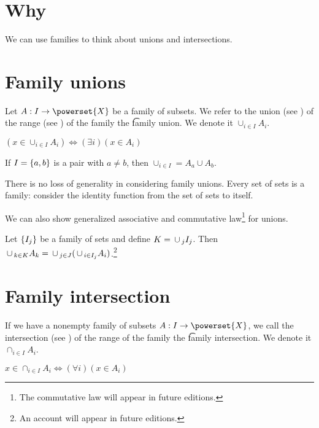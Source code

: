 
\section*{Why}

We can use families to think about unions and intersections.

\section*{Family unions}

Let $A: I \to \powerset{X}$ be a family of subsets.
We refer to the union (see ) of the range (see ) of the family the \t{family union}.
We denote it $\cup_{i \in I} A_i$.

\begin{proposition}
$(x \in \cup_{i \in I} A_i) \iff (\exists i)(x \in A_i)$
\end{proposition}

If $I = \{a, b\}$ is a pair with $a \neq b$, then $\cup_{i \in I} = A_a \cup A_b$.

There is no loss of generality in considering family unions.
Every set of sets is a family: consider the identity function from the set of sets to itself.

We can also show generalized associative and commutative law\footnote{The commutative law will appear in future editions.}
for unions.

\begin{proposition}
Let $\{I_j\}$ be a family of sets and define $K = \,\cup\,_{j} I_j$. Then $\,\cup\,_{k \in K} A_k = \,\cup\,_{j \in J}(\,\cup\,_{i \in I_j} A_i)$.\footnote{An account will appear in future editions.}
\end{proposition}

\section*{Family intersection}

If we have a nonempty family of subsets $A: I \to \powerset{X}$, we call the intersection (see ) of the range of the family the \t{family intersection}.
We denote it $\cap _{i \in I} A_i$.

\begin{proposition}
$x \in \cap _{i \in I} A_i \iff (\forall i)(x \in A_i)$
\end{proposition}

